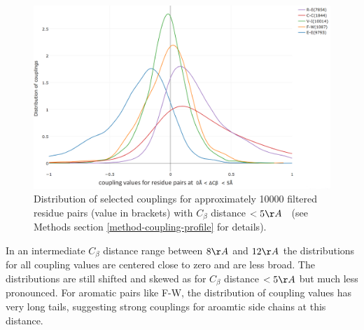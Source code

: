 \documentclass[12pt,a4paper,twoside]{book}
\newcommand{\Cb}{C_\beta}
\theoremstyle{definition}
\theoremstyle{definition}
\theoremstyle{remark}
\begin{document}
\begin{figure}

{\centering \includegraphics[width=0.9\linewidth]{img/coupling_matrix_analysis/1d_coupling_profile_0_5} 

}

\caption{Distribution of selected couplings
for approximately 10000 filtered residue pairs (value in brackets) with
\(\Cb\) distance \(< 5\AA \; \;\) (see Methods section
\ref{method-coupling-profile} for details).}\label{fig:1d-coupling-profile-0-5}
\end{figure}

In an intermediate \(\Cb\) distance range between \(8\AA\) and \(12\AA\)
the distributions for all coupling values are centered close to zero and
are less broad. The distributions are still shifted and skewed as for
\(\Cb\) distance \(< 5\AA\) but much less pronounced. For aromatic pairs
like F-W, the distribution of coupling values has very long tails,
suggesting strong couplings for aroamtic side chains at this distance.
\end{document}
